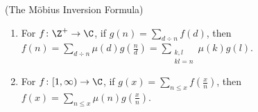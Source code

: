 \thm (The M\"obius Inversion Formula)
\begin{enumerate}
\item For $f\colon\Z^+\to\C$, if $g(n)=\sum_{d\div n}f(d)$, then $f(n)=\sum_{d\div n}\mu(d)g(\frac nd)=\sum_{\substack{k,l\\kl=n}}\mu(k)g(l)$.
\item For $f\colon[1,\infty)\to\C$, if $g(x)=\sum_{n\leq x}f(\frac xn)$, then $f(x)=\sum_{n\leq x}\mu(n)g(\frac xn)$.
\end{enumerate}
